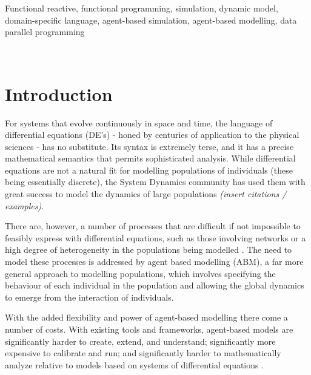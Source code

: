 \documentclass{sig-alternate}
\begin{document}

\keywords
Functional reactive, functional programming, simulation, dynamic model, domain-specific language, agent-based simulation, agent-based modelling, data parallel programming

\

\section{Introduction}



For systems that evolve continuously in space and time, the language of differential equations (DE's) - honed by centuries of application to the physical sciences - has no substitute. Its syntax is extremely terse, and it has a precise mathematical semantics that permits sophisticated analysis. While differential equations are not a natural fit for modelling populations of individuals (these being essentially discrete), the System Dynamics community has used them with great success to model the dynamics of large populations \textit{(insert citations  / examples)}. 

  There are, however,  a number of processes that are difficult if not impossible to feasibly express with differential equations, such as those involving networks or a high degree of heterogeneity in the populations being modelled \cite{system_dyn_tradeoffs}. The need to model these processes is addressed by agent based modelling (ABM), a far more general approach to modelling populations, which involves specifying the behaviour of each individual in the population and allowing the global dynamics to emerge from the interaction of individuals. 
  
  With the added flexibility and power of agent-based modelling there come a number of costs. With existing tools and frameworks, agent-based models are significantly harder to create, extend, and understand; significantly more expensive to calibrate and run; and significantly harder to mathematically analyze relative to models based on systems of differential equations \cite{ab_vs_de}. 
  
\end{document}
